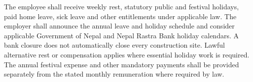 The employee shall receive weekly rest, statutory public and festival holidays,
paid home leave, sick leave and other entitlements under applicable law.
The employer shall announce the annual leave and holiday schedule and consider
applicable Government of Nepal and Nepal Rastra Bank holiday calendars.
A bank closure does not automatically close every construction site.
Lawful alternative rest or compensation applies where essential holiday work is required.
The annual festival expense and other mandatory payments shall be provided separately
from the stated monthly remuneration where required by law.
